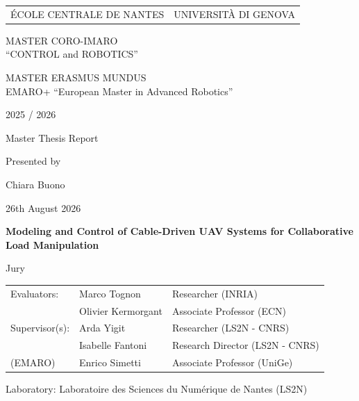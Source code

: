 \thispagestyle{empty}

\def\lskip{\vspace{0.5cm}}

\noindent
\begin{tabularx}{\textwidth}{@{} X >{\raggedleft\arraybackslash}X @{}}
ÉCOLE CENTRALE DE NANTES & UNIVERSITÀ DI GENOVA
\end{tabularx}

\vspace{2cm}

\begin{center} 
    \large\sc MASTER CORO-IMARO\\ 
    \normalsize{``CONTROL and ROBOTICS''} 
\end{center}

\begin{center} 
    \large\sc MASTER ERASMUS MUNDUS \\ 
    \normalsize{EMARO+ ``European Master in Advanced Robotics''} 
\end{center}

\begin{center}
    2025 / 2026\lskip
    
    Master Thesis Report\lskip
    
    Presented by\lskip 
    
    Chiara Buono\lskip
    
    26th August 2026\lskip\lskip
    
    {\Large \textbf{Modeling and Control of Cable-Driven UAV Systems for Collaborative Load Manipulation}}
    
    \vfill

    Jury\lskip
\end{center}

\noindent
\begin{tabularx}{\textwidth}{@{} l l X @{}}
Evaluators:     & Marco Tognon        & Researcher (INRIA) \\
                & Olivier Kermorgant  & Associate Professor (ECN) \\ 
Supervisor(s):  & Arda Yigit          & Researcher (LS2N - CNRS) \\
                & Isabelle Fantoni    & Research Director (LS2N - CNRS) \\
(EMARO)         & Enrico Simetti      & Associate Professor (UniGe)
\end{tabularx}

\lskip

\begin{flushleft}
 Laboratory: Laboratoire des Sciences du Numérique de Nantes (LS2N)
\end{flushleft}

\newpage
\thispagestyle{empty}
\null
\newpage
\addtocounter{page}{-1}
\pagestyle{fancy}